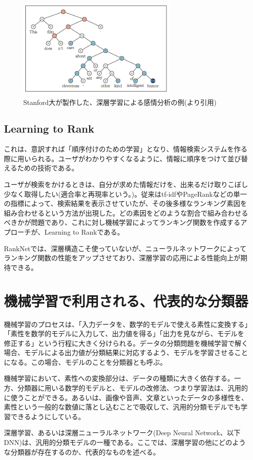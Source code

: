 \begin{figure}[tbp]
 \centering
  \includegraphics[width=80mm]{img/c2/rntn_ex}
 \caption{Stanford大が製作した、深層学習による感情分析の例(\cite{socher2013recursive}より引用)}
 \label{c2_rntn_ex}
\end{figure}

\subsection{Learning to Rank}
これは、意訳すれば「順序付けのための学習」となり、情報検索システムを作る際に用いられる。ユーザがわかりやすくなるように、情報に順序をつけて並び替えるための技術である。\par
ユーザが検索をかけるときは、自分が求めた情報だけを、出来るだけ取りこぼし少なく取得したい(適合率と再現率という。\cite{jianshen1999qingbaojiansuotoyanyuchuli})。従来はtf-idfやPageRank\cite{brin1998the-anatomy}\cite{page1999the-pagerank}などの単一の指標によって、検索結果を表示させていたが、その後多様なランキング素因を組み合わせるという方法が出現した。どの素因をどのような割合で組み合わせるべきかが問題であり、これに対し機械学習によってランキング関数を作成するアプローチが、Learning to Rankである。\par
RankNet\cite{burges2005learning}では、深層構造こそ使っていないが、ニューラルネットワークによってランキング関数の性能をアップさせており、深層学習の応用による性能向上が期待できる。

\section{機械学習で利用される、代表的な分類器}
機械学習のプロセスは、「入力データを、数学的モデルで使える素性に変換する」「素性を数学的モデルに入力して、出力値を得る」「出力を見ながら、モデルを修正する」という行程に大きく分けられる。データの分類問題を機械学習で解く場合、モデルによる出力値が分類結果に対応するよう、モデルを学習させることになる。この場合、モデルのことを分類器とも呼ぶ。\par
機械学習において、素性への変換部分は、データの種類に大きく依存する。一方、分類器に用いる数学的モデルと、モデルの改修法、つまり学習法は、汎用的に使うことができる。あるいは、画像や音声、文章といったデータの多様性を、素性という一般的な数値に落とし込むことで吸収して、汎用的分類モデルでも学習できるようにしている。\par
深層学習、あるいは深層ニューラルネットワーク(Deep Neural Network、以下DNN)は、汎用的分類モデルの一種である。ここでは、深層学習の他にどのような分類器が存在するのか、代表的なものを述べる。

